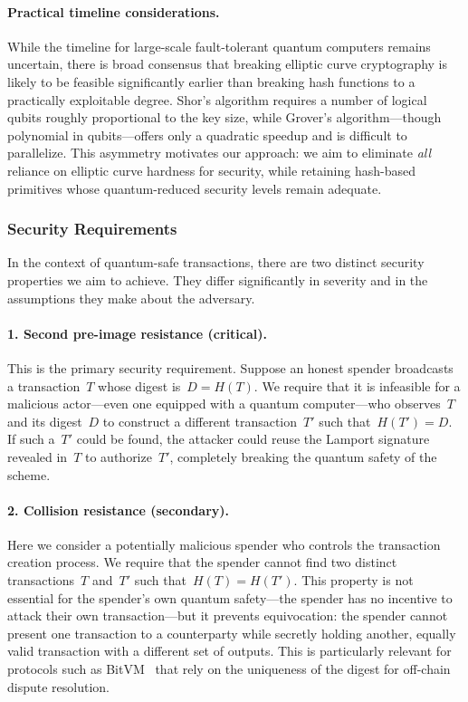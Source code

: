 \documentclass[11pt, a4paper]{article}
\begin{document}
\paragraph{Practical timeline considerations.}
While the timeline for large-scale fault-tolerant quantum computers remains uncertain, there is broad consensus that breaking elliptic curve cryptography is likely to be feasible significantly earlier than breaking hash functions to a practically exploitable degree. Shor's algorithm requires a number of logical qubits roughly proportional to the key size, while Grover's algorithm---though polynomial in qubits---offers only a quadratic speedup and is difficult to parallelize. This asymmetry motivates our approach: we aim to eliminate \emph{all} reliance on elliptic curve hardness for security, while retaining hash-based primitives whose quantum-reduced security levels remain adequate.

\subsubsection{Security Requirements}

In the context of quantum-safe transactions, there are two distinct security properties we aim to achieve. They differ significantly in severity and in the assumptions they make about the adversary.

\paragraph{1. Second pre-image resistance (critical).}
This is the primary security requirement. Suppose an honest spender broadcasts a transaction~$T$ whose digest is~$D = H(T)$. We require that it is infeasible for a malicious actor---even one equipped with a quantum computer---who observes~$T$ and its digest~$D$ to construct a different transaction~$T'$ such that~$H(T') = D$. If such a~$T'$ could be found, the attacker could reuse the Lamport signature revealed in~$T$ to authorize~$T'$, completely breaking the quantum safety of the scheme.

\paragraph{2. Collision resistance (secondary).}
Here we consider a potentially malicious spender who controls the transaction creation process. We require that the spender cannot find two distinct transactions~$T$ and~$T'$ such that~$H(T) = H(T')$. This property is not essential for the spender's own quantum safety---the spender has no incentive to attack their own transaction---but it prevents equivocation: the spender cannot present one transaction to a counterparty while secretly holding another, equally valid transaction with a different set of outputs. This is particularly relevant for protocols such as BitVM~\cite{linus2024binohash} that rely on the uniqueness of the digest for off-chain dispute resolution.
\end{document}
